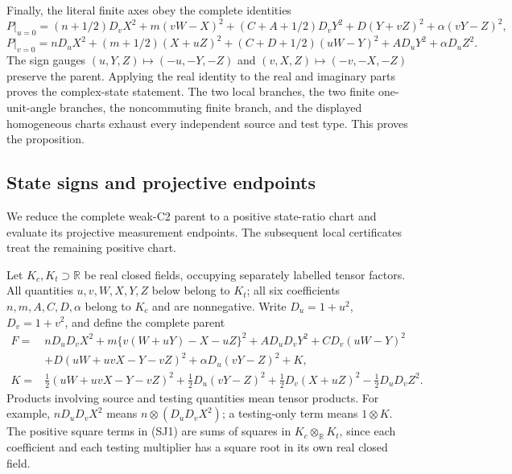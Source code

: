 Finally, the literal finite axes obey the complete identities
\begin{equation}
 P|_{u=0}=(n+1/2)D_vX^2+m(vW-X)^2
 +(C+A+1/2)D_vY^2+D(Y+vZ)^2+\alpha(vY-Z)^2,
\label{eq:c2-literal-u-axis}
\end{equation}
\begin{equation}
 P|_{v=0}=nD_uX^2+(m+1/2)(X+uZ)^2
 +(C+D+1/2)(uW-Y)^2+AD_uY^2+\alpha D_uZ^2.
\label{eq:c2-literal-v-axis}
\end{equation}
The sign gauges $(u,Y,Z)\mapsto(-u,-Y,-Z)$ and
$(v,X,Z)\mapsto(-v,-X,-Z)$ preserve the parent. Applying the real
identity to the real and imaginary parts proves the complex-state
statement. The two local branches, the two finite one-unit-angle
branches, the noncommuting finite branch, and the displayed homogeneous
charts exhaust every independent source and test type. This proves the
proposition.

\subsection{State signs and projective endpoints}
\label{component:pf77de02d80c4}

\label{pf77de02d80c4:sec:rederived-state-join}

We reduce the complete weak-C2 parent to a positive state-ratio chart
and evaluate its projective measurement endpoints. The subsequent local
certificates treat the remaining positive chart.

Let $K_c,K_t\supset\mathbb R$ be real closed fields, occupying separately
labelled tensor factors.  All quantities $u,v,W,X,Y,Z$ below belong to $K_t$;
all six coefficients $n,m,A,C,D,\alpha$ belong to $K_c$ and are nonnegative.
Write $D_u=1+u^2$, $D_v=1+v^2$, and define the complete parent
\begin{align}
 F={}&nD_uD_vX^2+m\{v(W+uY)-X-uZ\}^2
       +AD_uD_vY^2+CD_v(uW-Y)^2\\
    &+D(uW+uvX-Y-vZ)^2+\alpha D_u(vY-Z)^2+K,\tag{SJ1}\\
 K={}&\tfrac12(uW+uvX-Y-vZ)^2
       +\tfrac12D_u(vY-Z)^2
       +\tfrac12D_v(X+uZ)^2-\tfrac12D_uD_vZ^2.\tag{SJ2}
\end{align}
Products involving source and testing quantities mean tensor products.
For example, $nD_uD_vX^2$ means
$n\otimes(D_uD_vX^2)$; a testing-only term means $1\otimes K$.
The positive square terms in (SJ1) are sums of squares in
$K_c\otimes_{\mathbb R}K_t$, since each coefficient and each testing
multiplier has a square root in its own real closed field.

